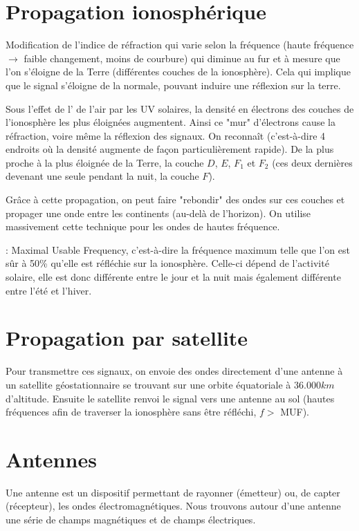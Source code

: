 \section{Propagation ionosphérique}

Modification de l'indice de réfraction qui varie selon la fréquence (haute fréquence $\rightarrow$ faible changement, moins de courbure) qui diminue au fur et à mesure que l'on s'éloigne de la Terre (différentes couches de la ionosphère). Cela qui implique que le signal s'éloigne de la normale, pouvant induire une réflexion sur la terre.

Sous l'effet de l' de l'air par les UV solaires, la densité en électrons des couches de l'ionosphère les plus éloignées augmentent. Ainsi ce "mur" d'électrons cause la réfraction, voire même la réflexion des signaux. On reconnaît  (c'est-à-dire 4 endroits où la densité augmente de façon particulièrement rapide). De la plus proche à la plus éloignée de la Terre, la couche $D$, $E$, $F_1$ et $F_2$ (ces deux dernières devenant une seule pendant la nuit, la couche $F$).

Grâce à cette propagation, on peut faire "rebondir" des ondes sur ces couches et propager une onde entre les continents (au-delà de l'horizon). On utilise massivement cette technique pour les ondes de hautes fréquence.

 : Maximal Usable Frequency, c'est-à-dire la fréquence maximum telle que l'on est sûr à 50\% qu'elle est réfléchie sur la ionosphère. Celle-ci dépend de l'activité solaire, elle est donc différente entre le jour et la nuit mais également différente entre l'été et l'hiver.

\section{Propagation par satellite}

Pour transmettre ces signaux, on envoie des ondes directement d'une antenne à un satellite géostationnaire se trouvant sur une orbite équatoriale à $36.000km$ d'altitude. Ensuite le satellite renvoi le signal vers une antenne au sol (hautes fréquences afin de traverser la ionosphère sans être réfléchi, $f >$ MUF).

\section{Antennes}

Une antenne est un dispositif permettant de rayonner (émetteur) ou, de capter (récepteur), les ondes électromagnétiques. Nous trouvons autour d'une antenne une série de champs magnétiques et de champs électriques.

